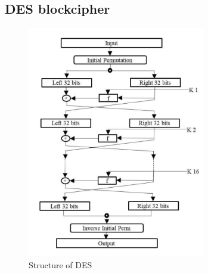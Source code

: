 \subsection{DES blockcipher}
\begin{figure}[H]
	\centering
	\includegraphics[width=220pt]{img/symmetric_cryptosystems/des_structure}
	\caption{Structure of DES}
\end{figure}
